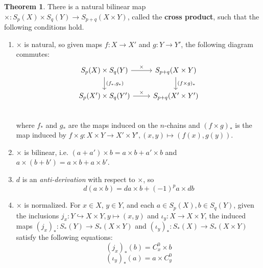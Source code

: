 \documentclass[11pt, oneside]{amsart}   	%
\theoremstyle{definition}
\newtheorem{theorem}{Theorem}[section]
\begin{document}
\begin{theorem}
	There is a natural bilinear map $\times : S_p(X)\times S_q(Y)\rightarrow S_{p + q}(X \times Y)$, called the \textbf{cross 
	product}, such that the following conditions hold.
	\begin{enumerate}
		\item $\times$ is natural, so given maps $f : X\rightarrow X'$ and $g : Y\rightarrow Y'$, the following diagram 
		commutes:
		\[\begin{tikzcd}
			S_p(X)\times S_q(Y) \arrow[r, "\times"]\arrow[d, "{(f_*, g_*)}"] & S_{p + q}(X \times Y)\arrow[d, "(f \times g)_*"] \\
			S_p(X')\times S_q(Y')\arrow[r, "\times"] & S_{p + q}(X'\times Y') \\
		\end{tikzcd}\]
		where $f_*$ and $g_*$ are the maps induced on the $n$-chains and $(f\times g)_*$ is the map induced by 
		$f\times g : X\times Y\rightarrow X'\times Y', (x, y)\mapsto (f(x), g(y))$. 
		\item $\times$ is bilinear, i.e. $(a + a')\times b = a\times b + a'\times b$ and $a\times (b + b') = a\times b + a\times 
		b'$. 
		\item $d$ is an \textit{anti-derivation} with respect to $\times$, so
		\begin{equation}
			d(a\times b) = da\times b + (-1)^p a\times db
		\end{equation}
		\item $\times$ is normalized. For $x\in X$, $y\in Y$, and each $a\in S_p(X), b\in S_q(Y)$, given the inclusions 
		$j_x : Y\hookrightarrow X\times Y, y\mapsto (x, y)$ and $\iota_y : X\rightarrow X\times Y$, the induced maps 
		$(j_x)_* : S_*(Y)\rightarrow S_*(X\times Y)$ and $(\iota_y)_* : S_*(X)\rightarrow S_*(X\times Y)$ satisfy the 
		following equations:
		\begin{equation}
			(j_x)_*(b) = C_x^0\times b
		\end{equation}
		\begin{equation}
			(\iota_y)_* (a) = a\times C_y^0
		\end{equation}
	\end{enumerate}
\label{thm:cross_product}
\end{theorem}
\end{document}
